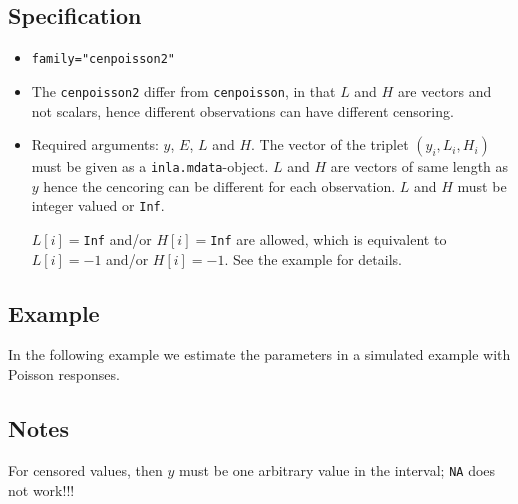\documentclass[a4paper,11pt]{article}
\begin{document}
\subsection*{Specification}

\begin{itemize}
\item \texttt{family="cenpoisson2"}
\item The \texttt{cenpoisson2} differ from \texttt{cenpoisson}, in
    that $L$ and $H$ are vectors and not scalars, hence different
    observations can have different censoring.
\item Required arguments: $y$, $E$, $L$ and $H$. The vector of the
    triplet $(y_i,L_i,H_i)$ must be given as a
    \texttt{inla.mdata}-object. $L$ and $H$ are vectors of same length
    as $y$ hence the cencoring can be different for each observation.
    $L$ and $H$ must be integer valued or \texttt{Inf}.

    $L[i]=$\texttt{Inf} and/or $H[i]=$\texttt{Inf} are allowed, which
    is equivalent to $L[i]= -1$ and/or $H[i] = -1$. See the example
    for details.
\end{itemize}

\subsection*{Example}

In the following example we estimate the parameters in a simulated
example with Poisson responses.
{\small

}

\subsection*{Notes}

For censored values, then $y$ must be one arbitrary value in the interval; \texttt{NA} does not work!!!
\end{document}

